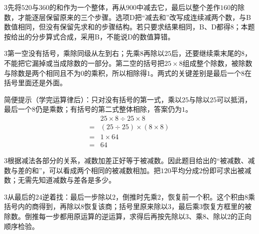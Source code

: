\documentclass[multi=snippet,border={5bp 20bp 5bp 5bp}]{standalone}
\newenvironment{snippet}[3]{\begin{minipage}{#1bp}\color{answerred}\fontsize{#2}{#3}\selectfont\raggedright}{\end{minipage}}
\begin{document}
\begin{snippet}{505}{11.5}{14}\begin{multicols}{3}\raggedcolumns 先将\(520\)\allowbreak 与\(360\)\allowbreak 的和作为一个整体，再从\(900\)\allowbreak 中减去它，最后以整个差作\(160\)\allowbreak 的除数，才能逐层保留原来的三个步骤。选项D把“减去和”改写成连续减两个数，与B数值相同，但没有保留先求和的步骤结构。若只要求结果相同，B、D都得\(8\)\allowbreak ；本题按给出的分步算式合成，采用B，不能说D的数值算错。\end{multicols}\end{snippet}
\begin{snippet}{505}{11.5}{14}\begin{multicols}{3}\raggedcolumns 第一空没有括号，乘除同级从左到右；先乘\(8\)\allowbreak 再除以\(25\)\allowbreak 后，还要继续乘末尾的\(8\)\allowbreak ，不能把它漏掉或当成除数的一部分。第二空的括号把\(25\times8\)\allowbreak 组成整个除数，被除数与除数是两个相同且不为\(0\)\allowbreak 的乘积，所以相除得\(1\)\allowbreak 。两式的关键差别是最后一个\(8\)\allowbreak 在括号里面还是外面。\par 简便提示（学完运算律后）：只对没有括号的第一式，乘以\(25\)\allowbreak 与除以\(25\)\allowbreak 可以抵消，最后一个\(8\)\allowbreak 仍是乘数；有括号的第二式整体相除，答案仍为\(1\)\allowbreak 。\[\begin{aligned}&25\times8\div25\times8\\={}&(25\div25)\times(8\times8)\\={}&1\times64\\={}&64\end{aligned}\]\end{multicols}\end{snippet}
\begin{snippet}{505}{11.5}{14}\begin{multicols}{3}\raggedcolumns 根据减法各部分的关系，减数加差正好等于被减数。因此题目给出的“被减数、减数与差的和”，可以看成两个相同的被减数相加。把\(120\)\allowbreak 平均分成\(2\)\allowbreak 份即可求出被减数；无需先知道减数与差各是多少。\end{multicols}\end{snippet}
\begin{snippet}{505}{11.5}{14}\begin{multicols}{3}\raggedcolumns 从最后的\(24\)\allowbreak 逆着找：最后一步除以\(2\)\allowbreak ，倒推时先乘\(2\)\allowbreak ，恢复前一个积。这个积由\(8\)\allowbreak 乘括号内的商得到，再除以\(8\)\allowbreak 恢复该商；括号里原来除以\(3\)\allowbreak ，最后乘\(3\)\allowbreak 恢复方框里的被除数。倒推每一步都用原运算的逆运算，求得后再按先除以\(3\)\allowbreak 、乘\(8\)\allowbreak 、除以\(2\)\allowbreak 的正向顺序检验。\end{multicols}\end{snippet}
\end{document}
